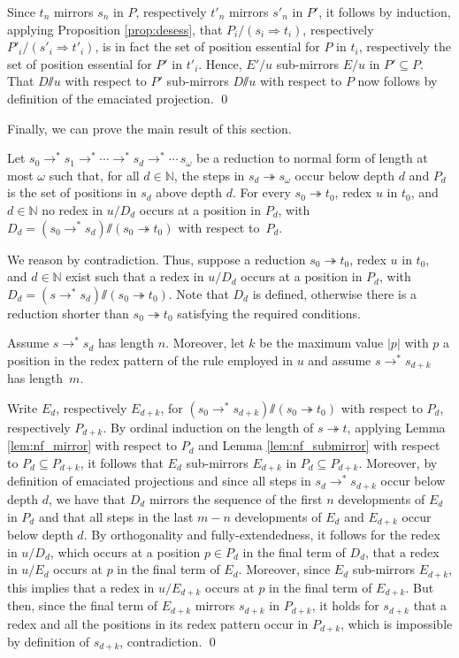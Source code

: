 \documentclass{LMCS}
\theoremstyle{definition}
\newcommand{\rewt}{\rightarrow^*}
\newcommand{\trewt}{\twoheadrightarrow}
\newcommand{\emmy}{\mathord{\sslash}}
\newcommand{\natnum}{\mathbb{N}}
\newcommand{\dev}{\Rightarrow}
\begin{document}
Since $t_n$ mirrors $s_n$ in $P$, respectively $t'_n$ mirrors $s'_n$ in $P'$, it follows by induction, applying Proposition \ref{prop:desess}, that $P_i / (s_i \dev t_i)$, respectively $P'_i / (s'_i \dev t'_i)$, is in fact the set of position essential for $P$ in $t_i$, respectively the set of position essential for $P'$ in $t'_i$. Hence, $E' / u$ sub-mirrors $E / u$ in $P' \subseteq P$. That $D \emmy u$ with respect to $P'$ sub-mirrors $D \emmy u$ with respect to $P$ now follows by definition of the emaciated projection.
\qed

Finally, we can prove the main result of this section.
\begin{lem}
\label{lem:nf_ok}
Let $s_0 \rewt s_1 \rewt \cdots \rewt s_d \rewt \cdots \, s_\omega$ be a reduction to normal form of length at most $\omega$ such that, for all $d \in \natnum$, the steps in $s_d \trewt s_\omega$ occur below depth $d$ and $P_d$ is the set of positions in $s_d$ above depth $d$. For every $s_0 \trewt t_0$, redex $u$ in $t_0$, and $d \in \natnum$ no redex in $u / D_d$ occurs at a position in $P_d$, with $D_d = (s_0 \rewt s_d) \emmy (s_0 \trewt t_0)$ with respect to~$P_d$.
\end{lem}

\proof
We reason by contradiction. Thus, suppose a reduction $s_0 \trewt t_0$, redex $u$ in $t_0$, and $d \in \natnum$ exist such that a redex in $u / D_d$ occurs at a position in $P_d$, with $D_d = (s \rewt s_d) \emmy (s_0 \trewt t_0)$. Note that $D_d$ is defined, otherwise there is a reduction shorter than $s_0 \trewt t_0$ satisfying the required conditions.

Assume $s \rewt s_d$ has length $n$. Moreover, let $k$ be the maximum value $|p|$ with $p$ a position in the redex pattern of the rule employed in $u$ and assume $s \rewt s_{d + k}$ has length~$m$.

Write $E_d$, respectively $E_{d + k}$, for $(s_0 \rewt s_{d + k}) \emmy (s_0 \trewt t_0)$ with respect to $P_d$, respectively $P_{d + k}$. By ordinal induction on the length of $s \trewt t$, applying Lemma \ref{lem:nf_mirror} with respect to $P_d$ and Lemma \ref{lem:nf_submirror} with respect to $P_d \subseteq P_{d + k}$, it follows that $E_d$ sub-mirrors $E_{d + k}$ in $P_d \subseteq P_{d + k}$. Moreover, by definition of emaciated projections and since all steps in $s_d \rewt s_{d + k}$ occur below depth $d$, we have that $D_d$ mirrors the sequence of the first $n$ developments of $E_d$ in $P_d$ and that all steps in the last $m - n$ developments of $E_d$ and $E_{d + k}$ occur below depth $d$. By orthogonality and fully-extendedness, it follows for the redex in $u / D_d$, which occurs at a position $p \in P_d$ in the final term of $D_d$, that a redex in $u / E_d$ occurs at $p$ in the final term of $E_d$. Moreover, since $E_d$ sub-mirrors $E_{d + k}$, this implies that a redex in $u / E_{d + k}$ occurs at $p$ in the final term of $E_{d + k}$. But then, since the final term of $E_{d + k}$ mirrors $s_{d + k}$ in $P_{d + k}$, it holds for $s_{d + k}$ that a redex and all the positions in its redex pattern occur in $P_{d + k}$, which is impossible by definition of $s_{d + k}$, contradiction.
\qed
\end{document}
